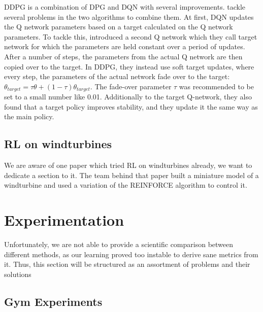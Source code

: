 \documentclass[hyperref,german,beleg]{cgvpub}
\begin{document}
\ac{DDPG} is a combination of \ac{DPG} and \ac{DQN} with several improvements. \cite{lillicrapCONTINUOUSCONTROLDEEP2015} tackle several problems in the two algorithms to combine them. At first, \ac{DQN} updates the Q network parameters based on a target calculated on the Q network parameters. To tackle this, \cite{mnihPlayingAtariDeep2013} introduced a second Q network which they call target network for which the parameters are held constant over a period of updates. After a number of steps, the parameters from the actual Q network are then copied over to the target. In \ac{DDPG}, they instead use soft target updates, where every step, the parameters of the actual network fade over to the target: $\theta_{target} = \tau \theta + (1 - \tau) \theta_{target}$. The fade-over parameter $\tau$ was recommended to be set to a small number like 0.01. Additionally to the target Q-network, they also found that a target policy improves stability, and they update it the same way as the main policy.


\section{RL on windturbines}
We are aware of one paper \cite{kolterDesignAnalysisLearning2012} which tried RL on windturbines already, we want to dedicate a section to it. The team behind that paper built a miniature model of a windturbine and used a variation of the \ac{REINFORCE} algorithm to control it.

\chapter{Experimentation}

Unfortunately, we are not able to provide a scientific comparison between different methods, as our learning proved too instable to derive sane metrics from it. Thus, this section will be structured as an assortment of problems and their solutions

\section{Gym Experiments}
\end{document}

